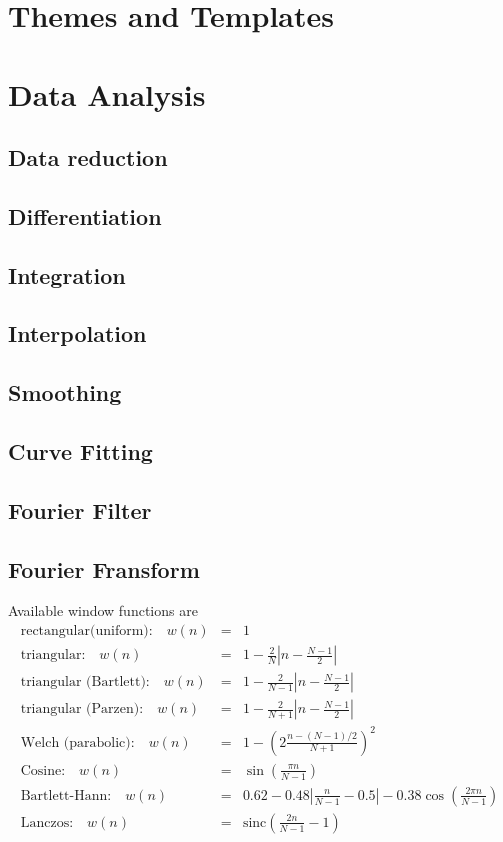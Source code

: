 \chapter{Themes and Templates}


\chapter{Data Analysis}
\section{Data reduction}
\section{Differentiation}
\section{Integration}
\section{Interpolation}
\section{Smoothing}
\section{Curve Fitting}
\section{Fourier Filter}

\newpage
\section{Fourier Fransform}
Available window functions are
\begin{eqnarray*}
\text{rectangular(uniform):} \quad  w(n) &=& 1 \\
\text{triangular:} \quad w(n) &=& 1 - \frac{2}{N} \left| n-\frac{N-1}{2} \right| \\
\text{triangular (Bartlett):} \quad  w(n) &=&  1 - \frac{2}{N-1} \left|n-\frac{N-1}{2}\right| \\
\text{triangular (Parzen):} \quad  w(n) &=& 1 - \frac{2}{N+1} \left| n-\frac{N-1}{2} \right| \\
\text{Welch (parabolic):} \quad  w(n) &=& 1 - \left(2 \frac{n-(N-1)/2}{N+1} \right)^2 \\
\text{Cosine:} \quad  w(n) &=& \sin\left( \frac{\pi n}{N-1} \right) \\
\text{Bartlett-Hann:} \quad  w(n) &=& 0.62 - 0.48 \left| \frac{n}{N-1}-0.5 \right| - 0.38 \cos\left(\frac{2\pi n}{N-1}\right) \\
\text{Lanczos:} \quad  w(n) &=& \mathrm{sinc} \left(\frac{2n}{N-1}-1\right) \\
\end{eqnarray*}

